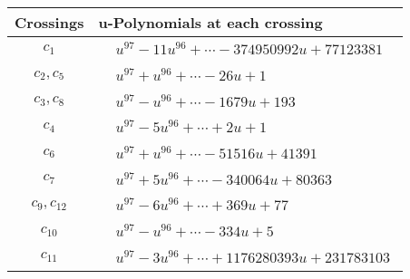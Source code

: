 \documentclass[1p]{elsarticle_modified}
\theoremstyle{definition}
\begin{document}
\begin{tabular}{m{50pt}|m{274pt}}
Crossings & \hspace{64pt}u-Polynomials at each crossing \\
\hline $$\begin{aligned}c_{1}\end{aligned}$$&$\begin{aligned}
&u^{97}-11 u^{96}+\cdots-374950992 u+77123381
\end{aligned}$\\
\hline $$\begin{aligned}c_{2},c_{5}\end{aligned}$$&$\begin{aligned}
&u^{97}+u^{96}+\cdots-26 u+1
\end{aligned}$\\
\hline $$\begin{aligned}c_{3},c_{8}\end{aligned}$$&$\begin{aligned}
&u^{97}- u^{96}+\cdots-1679 u+193
\end{aligned}$\\
\hline $$\begin{aligned}c_{4}\end{aligned}$$&$\begin{aligned}
&u^{97}-5 u^{96}+\cdots+2 u+1
\end{aligned}$\\
\hline $$\begin{aligned}c_{6}\end{aligned}$$&$\begin{aligned}
&u^{97}+u^{96}+\cdots-51516 u+41391
\end{aligned}$\\
\hline $$\begin{aligned}c_{7}\end{aligned}$$&$\begin{aligned}
&u^{97}+5 u^{96}+\cdots-340064 u+80363
\end{aligned}$\\
\hline $$\begin{aligned}c_{9},c_{12}\end{aligned}$$&$\begin{aligned}
&u^{97}-6 u^{96}+\cdots+369 u+77
\end{aligned}$\\
\hline $$\begin{aligned}c_{10}\end{aligned}$$&$\begin{aligned}
&u^{97}- u^{96}+\cdots-334 u+5
\end{aligned}$\\
\hline $$\begin{aligned}c_{11}\end{aligned}$$&$\begin{aligned}
&u^{97}-3 u^{96}+\cdots+1176280393 u+231783103
\end{aligned}$\\
\hline
\end{tabular}\\~\\
\end{document}
